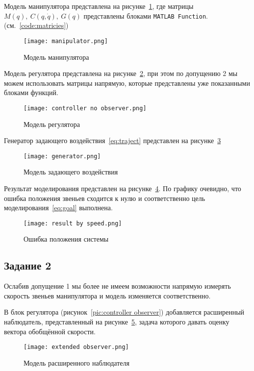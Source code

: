 \documentclass[14pt]{extarticle}
\begin{document}
    \sloppy Модель манипулятора представлена на рисунке~\ref{pic:manipulator}, где матрицы $M(q),\ C(q, \dot{q}),\ G(q)$ представлены блоками
    \texttt{MATLAB Function}. (см.~\ref{code:matricies})
    \begin{figure}[H]
        \centering
        \texttt{[image: manipulator.png]}
        \caption{Модель манипулятора}
        \label{pic:manipulator}
    \end{figure}

    Модель регулятора представлена на рисунке~\ref{pic:controller no observer}, при этом по допущению 2 мы можем использовать
    матрицы напрямую, которые представлены уже показанными блоками функций.
    \begin{figure}[H]
        \centering
        \texttt{[image: controller no observer.png]}
        \caption{Модель регулятора}
        \label{pic:controller no observer}
    \end{figure}

    Генератор задающего воздействия~\eqref{eq:traject} представлен на рисунке~\ref{pic:generator}
    \begin{figure}[H]
        \centering
        \texttt{[image: generator.png]}
        \caption{Модель задающего воздействия}
        \label{pic:generator}
    \end{figure}

    Результат моделирования представлен на рисунке~\ref{pic:result by speed}. По графику очевидно, что ошибка
    положения звеньев сходится к нулю и соответственно цель моделирования~\eqref{eq:goal} выполнена.
    \begin{figure}[H]
        \centering
        \texttt{[image: result by speed.png]}
        \caption{Ошибка положения системы}
        \label{pic:result by speed}
    \end{figure}

    \subsection*{Задание 2}
    Ослабив допущение 1 мы более не имеем возможности напрямую измерять скорость звеньев манипулятора
    и модель изменяется соответственно.

    В блок регулятора (рисунок~\ref{pic:controller observer}) добавляется расширенный наблюдатель,
    представленный на рисунке~\ref{pic:extended observer}, задача которого давать оценку вектора
    обобщённой скорости.
    \begin{figure}[H]
        \centering
        \texttt{[image: extended observer.png]}
        \caption{Модель расширенного наблюдателя}
        \label{pic:extended observer}
    \end{figure}
\end{document}
